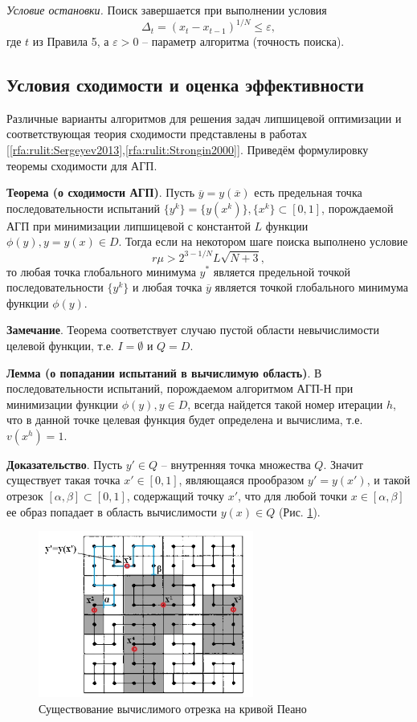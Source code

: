 \documentclass[10pt,a4paper]{book}
\begin{document}
\textit{Условие остановки.} Поиск завершается при выполнении условия 
\[
\Delta _t = (x_t-x_{t-1})^{1/N} \leq \varepsilon,
\]
где $t$ из Правила 5, а $\varepsilon>0$ -- параметр алгоритма (точность поиска).

\subsection{Условия сходимости и оценка эффективности}

Различные варианты алгоритмов для решения задач липшицевой оптимизации и соответствующая теория сходимости представлены в работах [\ref{rfa:rulit:Sergeyev2013},\ref{rfa:rulit:Strongin2000}]. Приведём формулировку теоремы сходимости для АГП.

\textbf{Теорема (о сходимости АГП)}. Пусть $\overline{y}=y(\overline{x})$ есть предельная точка последовательности испытаний $\{y^k\}=\{y(x^k)\}, \{x^k\} \subset [0,1]$, порождаемой АГП при минимизации липшицевой с константой $L$ функции $\phi(y), y = y(x) \in D$. Тогда если на некотором шаге поиска выполнено условие 
\[
r\mu > 2^{3-1/N}L\sqrt{N+3},
\]
то любая точка глобального минимума $y^*$ является предельной точкой последовательности $\{y^k\}$ и любая точка $\overline{y}$ является точкой глобального минимума функции $\phi(y)$.

\textbf{Замечание}. Теорема соответствует случаю пустой области невычислимости целевой функции, т.е. $I = \emptyset$ и $Q = D$.

\textbf{Лемма (о попадании испытаний в вычислимую область)}. В последовательности испытаний, порождаемом алгоритмом АГП-Н при минимизации функции $\phi(y), y \in D$, всегда найдется такой номер итерации $h$, что в данной точке целевая функция будет определена и вычислима, т.е. $v(x^h) = 1$.

\textbf{Доказательство}. Пусть $y' \in Q$ -- внутренняя точка множества $Q$. Значит существует такая точка $x' \in [0,1]$, являющаяся прообразом $y' = y(x')$, и такой отрезок $[\alpha, \beta] \subset [0, 1]$, содержащий точку $x'$, что для любой точки $x \in [\alpha, \beta]$ ее образ попадает в область вычислимости $y(x) \in Q$ (Рис. \ref{fig_1}). 

\begin{figure}[h]
\includegraphics[width=200pt]{pic/fig_1.jpg}
\caption{Существование вычислимого отрезка на кривой Пеано} \label{fig_1}
\end{figure}
\end{document}
